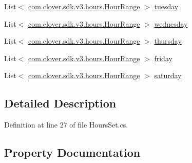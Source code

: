 \begin{DoxyCompactItemize}
\item 
List$<$ \hyperlink{classcom_1_1clover_1_1sdk_1_1v3_1_1hours_1_1_hour_range}{com.\+clover.\+sdk.\+v3.\+hours.\+Hour\+Range} $>$ \hyperlink{classcom_1_1clover_1_1sdk_1_1v3_1_1hours_1_1_hours_set_a065021afe719bb863aaccf5d4ec8c777}{tuesday}
\item 
List$<$ \hyperlink{classcom_1_1clover_1_1sdk_1_1v3_1_1hours_1_1_hour_range}{com.\+clover.\+sdk.\+v3.\+hours.\+Hour\+Range} $>$ \hyperlink{classcom_1_1clover_1_1sdk_1_1v3_1_1hours_1_1_hours_set_a4d70e383d21b1da7f78c2cf3a839eaad}{wednesday}
\item 
List$<$ \hyperlink{classcom_1_1clover_1_1sdk_1_1v3_1_1hours_1_1_hour_range}{com.\+clover.\+sdk.\+v3.\+hours.\+Hour\+Range} $>$ \hyperlink{classcom_1_1clover_1_1sdk_1_1v3_1_1hours_1_1_hours_set_a3683df784015b6ab96128fe5e7fe17d9}{thursday}
\item 
List$<$ \hyperlink{classcom_1_1clover_1_1sdk_1_1v3_1_1hours_1_1_hour_range}{com.\+clover.\+sdk.\+v3.\+hours.\+Hour\+Range} $>$ \hyperlink{classcom_1_1clover_1_1sdk_1_1v3_1_1hours_1_1_hours_set_a7e1be0b4ec6e879bf6e8d43620ee8743}{friday}
\item 
List$<$ \hyperlink{classcom_1_1clover_1_1sdk_1_1v3_1_1hours_1_1_hour_range}{com.\+clover.\+sdk.\+v3.\+hours.\+Hour\+Range} $>$ \hyperlink{classcom_1_1clover_1_1sdk_1_1v3_1_1hours_1_1_hours_set_a67c74107d204b2e0a006db64886fc9e7}{saturday}
\end{DoxyCompactItemize}


\subsection{Detailed Description}


Definition at line 27 of file Hours\+Set.\+cs.



\subsection{Property Documentation}
\mbox{\label{classcom_1_1clover_1_1sdk_1_1v3_1_1hours_1_1_hours_set_a7e1be0b4ec6e879bf6e8d43620ee8743}} 

